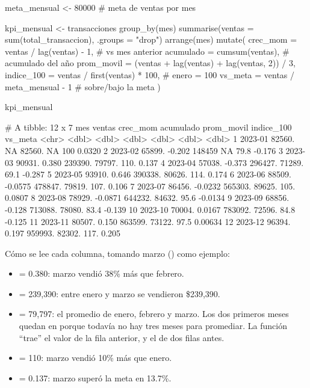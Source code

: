 \begin{rcode}
meta_mensual <- 80000   # meta de ventas por mes

kpi_mensual <- transacciones %
  group_by(mes) %
  summarise(ventas = sum(total_transaccion), .groups = "drop") %
  arrange(mes) %
  mutate(
    crec_mom   = ventas / lag(ventas) - 1,          # vs mes anterior
    acumulado  = cumsum(ventas),                    # acumulado del año
    prom_movil = (ventas + lag(ventas) + lag(ventas, 2)) / 3,
    indice_100 = ventas / first(ventas) * 100,      # enero = 100
    vs_meta    = ventas / meta_mensual - 1          # sobre/bajo la meta
  )

kpi_mensual
\end{rcode}
\begin{rsalida}
# A tibble: 12 x 7
   mes     ventas crec_mom acumulado prom_movil indice_100  vs_meta
   <chr>    <dbl>    <dbl>     <dbl>      <dbl>      <dbl>    <dbl>
 1 2023-01 82560.  NA         82560.        NA       100    0.0320
 2 2023-02 65899.  -0.202    148459         NA        79.8 -0.176
 3 2023-03 90931.   0.380    239390.     79797.      110.   0.137
 4 2023-04 57038.  -0.373    296427.     71289.       69.1 -0.287
 5 2023-05 93910.   0.646    390338.     80626.      114.   0.174
 6 2023-06 88509.  -0.0575   478847.     79819.      107.   0.106
 7 2023-07 86456.  -0.0232   565303.     89625.      105.   0.0807
 8 2023-08 78929.  -0.0871   644232.     84632.       95.6 -0.0134
 9 2023-09 68856.  -0.128    713088.     78080.       83.4 -0.139
10 2023-10 70004.   0.0167   783092.     72596.       84.8 -0.125
11 2023-11 80507.   0.150    863599.     73122.       97.5  0.00634
12 2023-12 96394.   0.197    959993.     82302.      117.   0.205
\end{rsalida}

Cómo se lee cada columna, tomando marzo () como ejemplo:
\begin{itemize}
  \item {} = 0.380: marzo vendió 38\% más que febrero.
  \item {} = 239,390: entre enero y marzo se vendieron
        \$239,390.
  \item {} = 79,797: el promedio de enero, febrero y marzo.
        Los dos primeros meses quedan en  porque todavía no hay
        tres meses para promediar. La función  ``trae'' el
        valor de la fila anterior, y  el de dos filas
        antes.
  \item {} = 110: marzo vendió 10\% más que enero.
  \item {} = 0.137: marzo superó la meta en 13.7\%.
\end{itemize}

